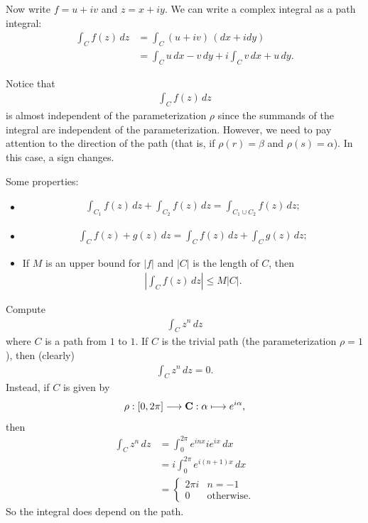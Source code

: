 \documentclass[11pt, oneside,margin=1in]{article}
\begin{document}
Now write $f=u+iv$ and $z=x+iy$. We can write a complex integral as a path integral:
 \begin{align*}
	 \int_{C}^{} f(z)  \, dz &= \int_{C}^{} (u+iv) \,(dx+idy) \\
				 &= \int_{C}^{} u  \, dx - v\,dy + i \int_{C}^{} v\,dx + u  \, dy.  
\end{align*}

Notice that
\begin{align*}
	\int_{C}^{} f(z)  \, dz 
\end{align*}
is almost independent of the parameterization $\rho$ since the summands of the integral are independent of the parameterization. However, we need to pay attention to the direction of the path (that is, if $\rho (r) = \beta$ and $\rho(s) = \alpha$). In this case, a sign changes.

Some properties:
\begin{itemize}
	\item \begin{align*}
		\int_{C_1}^{} f(z)  \, dz + \int_{C_2}^{} f(z)   \, dz = \int_{C_1\cup C_2}^{} f(z)  \, dz;   
	\end{align*}
\item \begin{align*}
	\int_{C}^{} f(z) +g(z) \, dz = \int_{C}^{} f(z)  \, dz + \int_{C}^{} g(z)  \, dz  ; 
\end{align*}
\item If $M$ is an upper bound for $\left\lvert f \right\rvert $ and $\left\lvert C \right\rvert $ is the length of $C$, then
	\begin{align*}
		\left\lvert \int_{C}^{} f(z)  \, dz  \right\rvert \le M\left\lvert C \right\rvert.
	\end{align*}
\end{itemize}

\begin{example}[ ]\label{}\text{}
Compute
	\begin{align*}
	\int_{C}^{} z^n  \, dz 
\end{align*}
where $C$ is a path from $1$ to $1$. If $C$ is the trivial path (the parameterization $\rho=1$), then (clearly) 
\begin{align*}
	\int_{C}^{} z^n  \, dz = 0. 
\end{align*}
Instead, if $C$ is given by 
\begin{align*}
	\rho : [0,2\pi] \longrightarrow \mathbf C : \alpha \longmapsto e^{i\alpha},
\end{align*}
then
\begin{align*}
	\int_{C}^{} z^n  \, dz &= \int_{0}^{2\pi} e^{inx} i e^{ix}  \, dx\\
			       &= i \int_{0}^{2\pi} e^{i(n+1)x}  \, dx\\
			       &=
			       \begin{cases}
				       2\pi i & n=-1\\
				       0 &\textrm{otherwise}.
			       \end{cases}
\end{align*}
So the integral does depend on the path.
\end{example}
\end{document}
